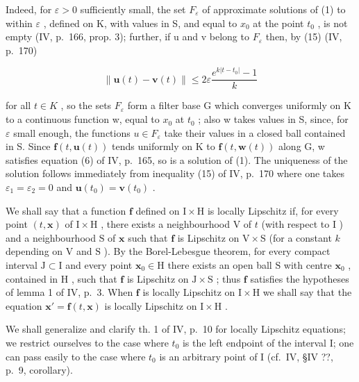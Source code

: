 Indeed, for \(\varepsilon > 0\) sufficiently small, the set \(F_{\varepsilon}\) of approximate solutions of (1) to within \(\varepsilon\) , defined on K, with values in S, and equal to \(x_{0}\) at the point \(t_{0}\) , is not empty (IV, p.~166, prop. 3); further, if u and v belong to \(F_{\varepsilon}\) then, by (15) (IV, p.~170)

\[
\| \mathbf {u} (t) - \mathbf {v} (t) \| \leqslant 2 \varepsilon \frac {e ^ {k | t - t _ {0} |} - 1}{k}
\]

for all \(t \in K\) , so the sets \(F_{\varepsilon}\) form a filter base G which converges uniformly on K to a continuous function w, equal to \(x_{0}\) at \(t_{0}\) ; also w takes values in S, since, for \(\varepsilon\) small enough, the functions \(u \in F_{\varepsilon}\) take their values in a closed ball contained in S. Since \(\mathbf{f}(t, \mathbf{u}(t))\) tends uniformly on K to \(\mathbf{f}(t, \mathbf{w}(t))\) along G, w satisfies equation (6) of IV, p.~165, so is a solution of (1). The uniqueness of the solution follows immediately from inequality (15) of IV, p.~170 where one takes \(\varepsilon_{1} = \varepsilon_{2} = 0\) and \(\mathbf{u}(t_{0}) = \mathbf{v}(t_{0})\) .

We shall say that a function \(\mathbf{f}\) defined on \(\mathrm{I} \times \mathrm{H}\) is locally Lipschitz if, for every point \((t, \mathbf{x})\) of \(\mathrm{I} \times \mathrm{H}\) , there exists a neighbourhood \(\mathrm{V}\) of \(t\) (with respect to \(\mathrm{I}\) ) and a neighbourhood \(\mathrm{S}\) of \(\mathbf{x}\) such that \(\mathbf{f}\) is Lipschitz on \(\mathrm{V} \times \mathrm{S}\) (for a constant \(k\) depending on \(\mathrm{V}\) and \(\mathrm{S}\) ). By the Borel-Lebesgue theorem, for every compact interval \(\mathrm{J} \subset \mathrm{I}\) and every point \(\mathbf{x}_0 \in \mathrm{H}\) there exists an open ball \(\mathrm{S}\) with centre \(\mathbf{x}_0\) , contained in \(\mathrm{H}\) , such that \(\mathbf{f}\) is Lipschitz on \(\mathrm{J} \times \mathrm{S}\) ; thus \(\mathbf{f}\) satisfies the hypotheses of lemma 1 of IV, p.~3. When \(\mathbf{f}\) is locally Lipschitz on \(\mathrm{I} \times \mathrm{H}\) we shall say that the equation \(\mathbf{x}' = \mathbf{f}(t, \mathbf{x})\) is locally Lipschitz on \(\mathrm{I} \times \mathrm{H}\) .

We shall generalize and clarify th. 1 of IV, p.~10 for locally Lipschitz equations; we restrict ourselves to the case where \(t_0\) is the left endpoint of the interval I; one can pass easily to the case where \(t_0\) is an arbitrary point of I (cf.~IV, §IV ??, p.~9, corollary).

